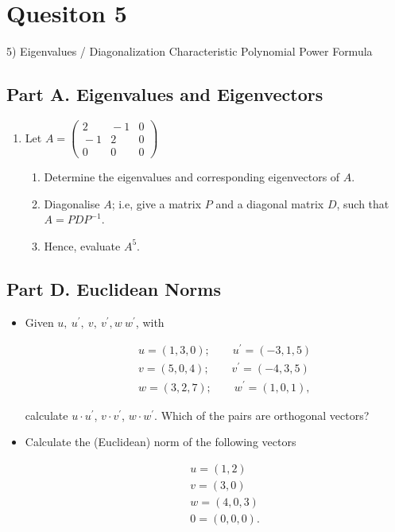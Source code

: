 \documentclass[12pt,a4paper]{article}
\begin{document}
\section*{Quesiton 5}
5) Eigenvalues / Diagonalization
Characteristic Polynomial
Power Formula

\subsection*{Part A. Eigenvalues and Eigenvectors}


\begin{enumerate}
	\item Let $A=\displaystyle\left(\begin{array}{ccc} 
	2&\!\!\!-1&0\\
	\!\!\!-1& 2&0\\
	0& 0& 0\end{array}\right)$
	
	\begin{enumerate}
		\medskip\item Determine the eigenvalues and corresponding eigenvectors of $A$.
		
		\medskip\item Diagonalise $A$; i.e, give a matrix $P$ and a diagonal matrix $D$, such that $A=PDP^{-1}$.
		
		\medskip \item Hence, evaluate $A^5$.
	\end{enumerate}\vspace{0.4cm}
	

	
\end{enumerate}
\subsection*{Part D. Euclidean Norms}
\begin{itemize}
	\item Given
	$u,\:u^{\prime},\:v,\:v^{\prime},w\:w^{\prime}$, with
	
	\begin{eqnarray*}
		& & u=(1,3,0);\qquad u^{\prime}=(-3,1,5)\\
		& & v=(5,0,4);\qquad v^{\prime}=(-4,3,5)\\
		& & w=(3,2,7);\qquad w^{\prime}=(1,0,1),
	\end{eqnarray*}
	
	calculate $u\cdot u^{\prime}$, $v\cdot v^{\prime}$, $w\cdot
	w^{\prime}$. Which of the pairs are orthogonal vectors?
	
	\vspace{0.25cm}\item Calculate the (Euclidean) norm of the
	following vectors
	
	\begin{eqnarray*}
		& & u=(1,2)\\
		& & v=(3,0)\\
		& & w=(4,0,3)\\
		& & 0=(0,0,0).
	\end{eqnarray*}
\end{itemize}
\end{document}
